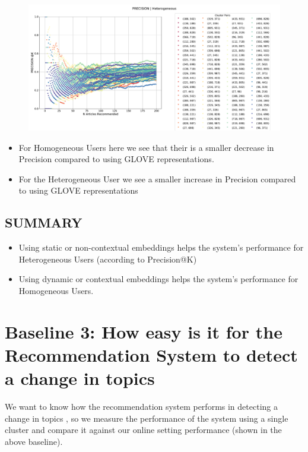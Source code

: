 \documentclass[a4paper,fontsize=8.0pt]{scrartcl}
\begin{document}
\begin{figure}[H]
 \includegraphics[width=1.0\textwidth]{Graphs/BERT/user_interaction_vs_model_performance_precision_all_cps_Heterogeneous.pdf}
\end{figure}
\begin{flushleft}
\begin{itemize}
    \item For Homogeneous Users here we see that their is a smaller decrease in Precision compared to using GLOVE representations.
    \item For the Heterogeneous User we see a smaller increase in Precision compared to using GLOVE representations
\end{itemize}
\end{flushleft}
\vspace{2ex}
\subsection{SUMMARY}
\begin{itemize}
    \item Using static or non-contextual embeddings helps the system's performance for Heterogeneous Users (according to Precision@K)
    \item Using dynamic or contextual embeddings helps the system's performance for Homogeneous Users.
\end{itemize}

\vspace{-1ex}
\newpage
\section{Baseline 3: How easy is it for the Recommendation System to detect a change in topics}
\begin{flushleft}
We want to know how the recommendation system performs in detecting a change in topics , so we measure the performance of the system using a single cluster and compare it against our online setting performance (shown in the above baseline). 
\end{flushleft}
\end{document}
